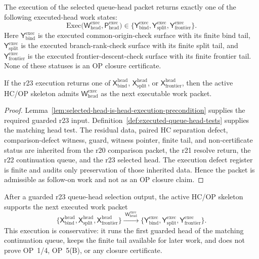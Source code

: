 \begin{definition}
\label{def:r24-selected-queue-head-execution-output}
The execution of the selected queue-head packet returns exactly one of the following executed-head work states:
\[
\mathrm{Exec}\bigl(\mathsf W_{\mathrm{head}}^{\mathrm{exec}},
                   \mathsf P_{\mathrm{head}}^{\mathrm{exec}}\bigr)
\in
\{\mathsf Y_{\mathrm{bind}}^{\mathrm{exec}},
  \mathsf Y_{\mathrm{split}}^{\mathrm{exec}},
  \mathsf Y_{\mathrm{frontier}}^{\mathrm{exec}}\}.
\]
Here \(\mathsf Y_{\mathrm{bind}}^{\mathrm{exec}}\) is the executed common-origin-check surface with its finite bind tail, \(\mathsf Y_{\mathrm{split}}^{\mathrm{exec}}\) is the executed branch-rank-check surface with its finite split tail, and \(\mathsf Y_{\mathrm{frontier}}^{\mathrm{exec}}\) is the executed frontier-descent-check surface with its finite frontier tail.  None of these statuses is an OP closure certificate.
\end{definition}

\begin{proposition}
\label{prop:selected-queue-head-execution-admissible-after-r23-head-selection}
If the r23 execution returns one of \(\mathsf X_{\mathrm{bind}}^{\mathrm{head}}\), \(\mathsf X_{\mathrm{split}}^{\mathrm{head}}\), or \(\mathsf X_{\mathrm{frontier}}^{\mathrm{head}}\), then the active HC/OP skeleton admits \(\mathsf W_{\mathrm{head}}^{\mathrm{exec}}\) as the next executable work packet.
\end{proposition}

\begin{proof}
Lemma~\ref{lem:selected-head-is-head-execution-precondition} supplies the required guarded r23 input.  Definition~\ref{def:executed-queue-head-tests} supplies the matching head test.  The residual data, paired HC separation defect, comparison-defect witness, guard, witness pointer, finite tail, and non-certificate status are inherited from the r20 comparison packet, the r21 resolve return, the r22 continuation queue, and the r23 selected head.  The execution defect register is finite and audits only preservation of those inherited data.  Hence the packet is admissible as follow-on work and not as an OP closure claim.
\end{proof}

\begin{theorem}
\label{thm:first-selected-queue-head-execution-packet}
After a guarded r23 queue-head selection output, the active HC/OP skeleton supports the next executed work packet
\[
  \{\mathsf X_{\mathrm{bind}}^{\mathrm{head}},
    \mathsf X_{\mathrm{split}}^{\mathrm{head}},
    \mathsf X_{\mathrm{frontier}}^{\mathrm{head}}\}
  \xrightarrow{\;\mathsf W_{\mathrm{head}}^{\mathrm{exec}}\;}
  \{\mathsf Y_{\mathrm{bind}}^{\mathrm{exec}},
    \mathsf Y_{\mathrm{split}}^{\mathrm{exec}},
    \mathsf Y_{\mathrm{frontier}}^{\mathrm{exec}}\}.
\]
This execution is conservative: it runs the first guarded head of the matching continuation queue, keeps the finite tail available for later work, and does not prove OP~1/4, OP~5(B), or any closure certificate.
\end{theorem}

